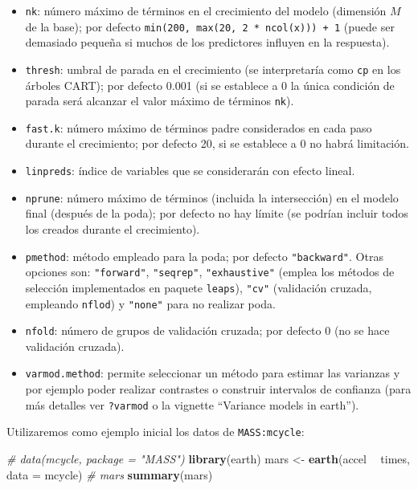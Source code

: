 \documentclass[
  spanish,
]{book}
\newenvironment{Shaded}{\begin{snugshade}}{\end{snugshade}}
\newcommand{\CommentTok}[1]{\textcolor[rgb]{0.56,0.35,0.01}{\textit{#1}}}
\newcommand{\DataTypeTok}[1]{\textcolor[rgb]{0.13,0.29,0.53}{#1}}
\newcommand{\KeywordTok}[1]{\textcolor[rgb]{0.13,0.29,0.53}{\textbf{#1}}}
\newcommand{\NormalTok}[1]{#1}
\newcommand{\OperatorTok}[1]{\textcolor[rgb]{0.81,0.36,0.00}{\textbf{#1}}}
\newcommand{\StringTok}[1]{\textcolor[rgb]{0.31,0.60,0.02}{#1}}
\theoremstyle{break}
\theoremstyle{definition}
\theoremstyle{definition}
\theoremstyle{definition}
\theoremstyle{remark}
\begin{document}
\begin{itemize}
\item
  \texttt{nk}: número máximo de términos en el crecimiento del modelo (dimensión \(M\) de la base); por defecto \texttt{min(200,\ max(20,\ 2\ *\ ncol(x)))\ +\ 1} (puede ser demasiado pequeña si muchos de los predictores influyen en la respuesta).
\item
  \texttt{thresh}: umbral de parada en el crecimiento (se interpretaría como \texttt{cp} en los árboles CART); por defecto 0.001 (si se establece a 0 la única condición de parada será alcanzar el valor máximo de términos \texttt{nk}).
\item
  \texttt{fast.k}: número máximo de términos padre considerados en cada paso durante el crecimiento; por defecto 20, si se establece a 0 no habrá limitación.
\item
  \texttt{linpreds}: índice de variables que se considerarán con efecto lineal.
\item
  \texttt{nprune}: número máximo de términos (incluida la intersección) en el modelo final (después de la poda); por defecto no hay límite (se podrían incluir todos los creados durante el crecimiento).
\item
  \texttt{pmethod}: método empleado para la poda; por defecto \texttt{"backward"}. Otras opciones son: \texttt{"forward"}, \texttt{"seqrep"}, \texttt{"exhaustive"} (emplea los métodos de selección implementados en paquete \texttt{leaps}), \texttt{"cv"} (validación cruzada, empleando \texttt{nflod}) y \texttt{"none"} para no realizar poda.
\item
  \texttt{nfold}: número de grupos de validación cruzada; por defecto 0 (no se hace validación cruzada).
\item
  \texttt{varmod.method}: permite seleccionar un método para estimar las varianzas y por ejemplo poder realizar contrastes o construir intervalos de confianza (para más detalles ver \texttt{?varmod} o la vignette ``Variance models in earth'').
\end{itemize}

Utilizaremos como ejemplo inicial los datos de \texttt{MASS:mcycle}:

\begin{Shaded}
\begin{Highlighting}[]
\CommentTok{# data(mcycle, package = "MASS")}
\KeywordTok{library}\NormalTok{(earth)}
\NormalTok{mars <-}\StringTok{ }\KeywordTok{earth}\NormalTok{(accel }\OperatorTok{~}\StringTok{ }\NormalTok{times, }\DataTypeTok{data =}\NormalTok{ mcycle)}
\CommentTok{# mars}
\KeywordTok{summary}\NormalTok{(mars)}
\end{Highlighting}
\end{Shaded}
\end{document}
